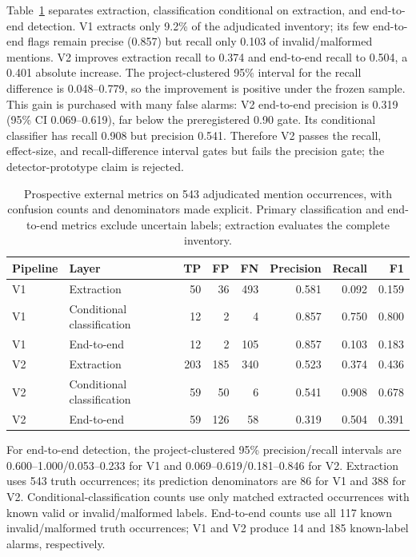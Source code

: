 \documentclass[pdflatex,sn-basic]{sn-jnl}
\begin{document}
Table~\ref{tab:external-v1-v2} separates extraction, classification conditional on extraction, and end-to-end detection. V1 extracts only 9.2\% of the adjudicated inventory; its few end-to-end flags remain precise (0.857) but recall only 0.103 of invalid/malformed mentions. V2 improves extraction recall to 0.374 and end-to-end recall to 0.504, a 0.401 absolute increase. The project-clustered 95\% interval for the recall difference is 0.048--0.779, so the improvement is positive under the frozen sample. This gain is purchased with many false alarms: V2 end-to-end precision is 0.319 (95\% CI 0.069--0.619), far below the preregistered 0.90 gate. Its conditional classifier has recall 0.908 but precision 0.541. Therefore V2 passes the recall, effect-size, and recall-difference interval gates but fails the precision gate; the detector-prototype claim is rejected.

\begin{table}[htbp]
\caption{Prospective external metrics on 543 adjudicated mention occurrences, with confusion counts and denominators made explicit. Primary classification and end-to-end metrics exclude uncertain labels; extraction evaluates the complete inventory.}
\label{tab:external-v1-v2}
{\footnotesize
\setlength{\tabcolsep}{3.5pt}
\begin{tabular}{@{}llrrrrrr@{}}
\toprule
Pipeline & Layer & TP & FP & FN & Precision & Recall & F1 \\
\midrule
V1 & Extraction & 50 & 36 & 493 & 0.581 & 0.092 & 0.159 \\
V1 & Conditional classification & 12 & 2 & 4 & 0.857 & 0.750 & 0.800 \\
V1 & End-to-end & 12 & 2 & 105 & 0.857 & 0.103 & 0.183 \\
\addlinespace
V2 & Extraction & 203 & 185 & 340 & 0.523 & 0.374 & 0.436 \\
V2 & Conditional classification & 59 & 50 & 6 & 0.541 & 0.908 & 0.678 \\
V2 & End-to-end & 59 & 126 & 58 & 0.319 & 0.504 & 0.391 \\
\bottomrule
\end{tabular}
}
\end{table}

For end-to-end detection, the project-clustered 95\% precision/recall intervals are 0.600--1.000/0.053--0.233 for V1 and 0.069--0.619/0.181--0.846 for V2. Extraction uses 543 truth occurrences; its prediction denominators are 86 for V1 and 388 for V2. Conditional-classification counts use only matched extracted occurrences with known valid or invalid/malformed labels. End-to-end counts use all 117 known invalid/malformed truth occurrences; V1 and V2 produce 14 and 185 known-label alarms, respectively.
\end{document}
